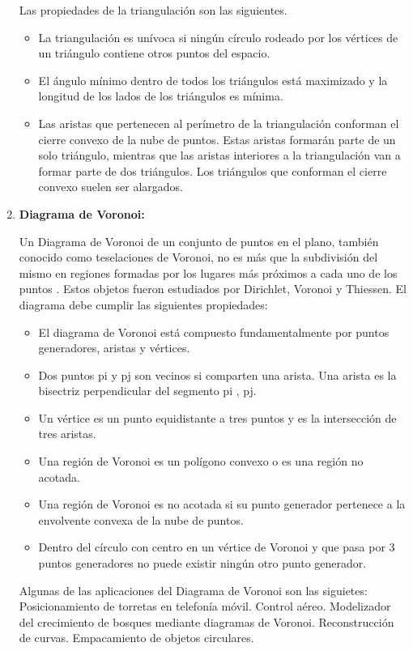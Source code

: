 \documentclass[11pt,twoside,A5]{article}
\begin{document}
\begin{enumerate}
Las propiedades de la triangulación son las siguientes.
\begin{itemize}
\item La triangulación es unívoca si ningún círculo rodeado por los vértices de un triángulo contiene otros puntos del espacio.
\item El ángulo mínimo dentro de todos los triángulos está maximizado y la longitud de los lados de los triángulos es mínima.
\item Las aristas que pertenecen al perímetro de la triangulación conforman el cierre convexo de la nube de puntos. Estas aristas formarán parte de un solo triángulo, mientras que las aristas interiores a la triangulación van a formar parte de dos triángulos. Los triángulos que conforman el cierre convexo suelen ser alargados.
\end{itemize}

\item \textbf{Diagrama de Voronoi:}

Un Diagrama de Voronoi de un conjunto de puntos en el plano, también conocido como teselaciones de Voronoi, no es más que la subdivisión del mismo en regiones formadas por los lugares más próximos a cada uno de los puntos \cite{berg2000,okabe2009}.
Estos objetos fueron estudiados por Dirichlet, Voronoi y Thiessen.
El diagrama debe cumplir las siguientes propiedades:

\begin{itemize}
\item El diagrama de Voronoi está compuesto fundamentalmente por puntos generadores, aristas y vértices.
\item Dos puntos pi y pj son vecinos si comparten una arista. Una arista es la bisectriz perpendicular del segmento pi , pj.
\item Un vértice es un punto equidistante a tres puntos y es la intersección de tres aristas.
\item Una región de Voronoi es un polígono convexo o es una región no acotada.
\item Una región de Voronoi es no acotada si su punto generador pertenece a la envolvente convexa de la nube de puntos.
\item Dentro del círculo con centro en un vértice de Voronoi y que pasa por 3 puntos generadores no puede existir ningún otro punto generador.
\end{itemize}

Algunas de las aplicaciones del Diagrama de Voronoi son las siguietes: Posicionamiento de torretas en telefonía móvil.
Control aéreo.
Modelizador del crecimiento de bosques mediante diagramas de Voronoi.
Reconstrucción de curvas.
Empacamiento de objetos circulares.


\end{enumerate}
\end{document}
